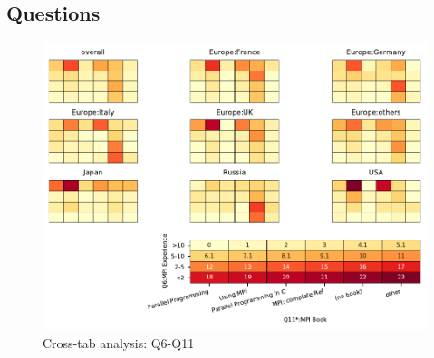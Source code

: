 
\subsection{Questions}


\begin{figure}
\begin{center}
\includegraphics[width=12cm]{../pdfs/Q6-Q11.pdf}
\caption{Cross-tab analysis: Q6-Q11}
\label{fig:Q6-Q11}
\end{center}
\end{figure}
